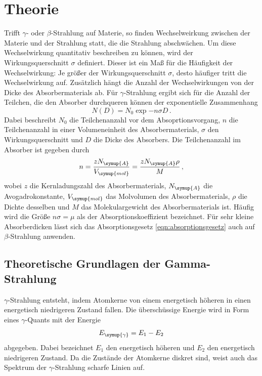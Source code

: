 \section{Theorie}
\label{sec:Theorie}
Trifft $\gamma$- oder $\beta$-Strahlung auf Materie, so finden Wechselweirkung
zwischen der Materie und der Strahlung statt, die die Strahlung abschwächen. Um
diese Wechselwirkung quantitativ beschreiben zu können, wird der Wirkungsquerschnitt
$\sigma$ definiert. Dieser ist ein Maß für die Häufigkeit der Wechselwirkung: Je größer
der Wirkungsquerschnitt $\sigma$, desto häufiger tritt die Wechselwirkung auf.
Zusätzlich hängt die Anzahl der Wechselwirkungen von der Dicke des Absorbermaterials ab.
Für $\gamma$-Strahlung ergibt sich für die Anzahl der Teilchen, die den Absorber
durchqueren können der exponentielle Zusammenhang
\begin{equation}
  N(D)=N_0 \exp{-n \sigma D} \,.
  \label{eqn:absorptionsgesetz}
\end{equation}
Dabei beschreibt $N_0$ die Teilchenanzahl vor dem Absoprtionsvorgang, $n$ die
Teilchenanzahl in einer Volumeneinheit des Absorbermaterials, $\sigma$ den Wirkungsquerschnitt
und $D$ die Dicke des Absorbers. Die Teilchenanzahl im Absorber ist gegeben durch
\begin{equation}
 n=\frac{z N_{\symup{A}}}{V_{\symup{mol}}}=\frac{z N_{\symup{A}} \rho}{M} \,,
\end{equation}
wobei $z$ die Kernladungszahl des Absorbermaterials, $N_{\symup{A}}$ die Avogadrokonstante,
$V_{\symup{mol}}$ das Molvolumen des Absorbermaterials, $\rho$ die Dichte desselben und
$M$ das Molekulargewicht des Absorbermaterials ist.
Häufig  wird die Größe $n \sigma =\mu$ als der Absorptionskoeffizient bezeichnet.
Für sehr kleine Absorberdicken lässt sich das Absorptionsgesetz \eqref{eqn:absorptionsgesetz}
auch auf $\beta$-Strahlung anwenden.


\subsection{Theoretische Grundlagen der Gamma-Strahlung} %
\label{subsec:gamma}

$\gamma$-Strahlung entsteht, indem Atomkerne von einem energetisch höheren in einen
energetisch niedrigeren Zustand fallen. Die überschüssige Energie wird in Form eines
$\gamma$-Quants mit der Energie
\begin{equation}
  E_{\symup{\gamma}}= E_1 - E_2
\end{equation}
abgegeben. Dabei bezeichnet $E_1$ den energetisch höheren und $E_2$ den energetisch
niedrigeren Zustand. Da die Zustände der Atomkerne diskret sind, weist auch das
Spektrum der $\gamma$-Strahlung scharfe Linien auf.

